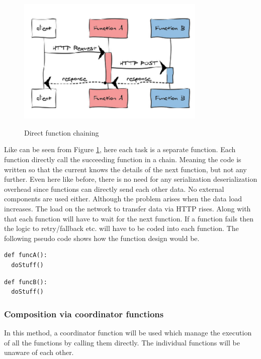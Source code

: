 \documentclass[12pt,titlepage]{article}
\begin{document}
\begin{figure}
\caption{Direct function chaining}
\centering
\includegraphics[width=90mm]{./thesis_images/func_chain.png}
\label{fig:Chaining}
\end{figure}

Like can be seen from Figure \ref{fig:Chaining}, here each task is a separate function. Each
function directly call the succeeding function in a chain. Meaning the code is
written so that the current knows the details of the next function, but not any
further. Even here like before, there is no need for any serialization
deserialization overhead since functions can directly send each other data. No
external components are used either. Although the problem arises when the data
load increases. The load on the network to transfer data via HTTP rises. Along
with that each function will have to wait for the next function. If a function
fails then the logic to retry/fallback etc. will have to be coded into each
function. The following pseudo code shows how the function design would be.


\begin{lstlisting}
def funcA():
  doStuff()
\end{lstlisting}


\begin{lstlisting}
def funcB():
  doStuff()
\end{lstlisting}

\subsubsection{Composition via coordinator functions}
\label{sec:org830f39f}

In this method, a coordinator function will be used which manage the execution
of all the functions by calling them directly. The individual functions will be
unaware of each other.
\end{document}
